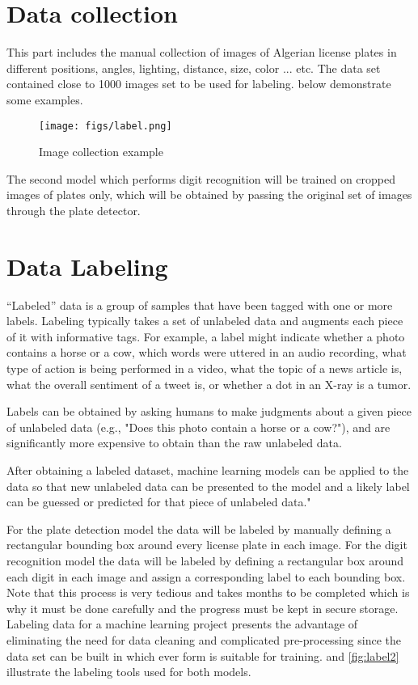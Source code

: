 \section{Data collection}
This part includes the manual collection of images of Algerian license plates in different positions, angles, lighting, distance, size, color ... etc. The data set contained close to 1000 images set to be used for labeling.  below demonstrate some examples.

\begin{figure}[H]
	\centering
	\texttt{[image: figs/label.png]}
	\caption{Image collection example}\label{fig:img1}
\end{figure}

The second model which performs digit recognition will be trained on cropped images of plates only, which will be obtained by passing the original set of images through the plate detector.

\section{Data Labeling}
``Labeled'' data is a group of samples that have been tagged with one or more labels. Labeling typically takes a set of unlabeled data and augments each piece of it with informative tags. For example, a label might indicate whether a photo contains a horse or a cow, which words were uttered in an audio recording, what type of action is being performed in a video, what the topic of a news article is, what the overall sentiment of a tweet is, or whether a dot in an X-ray is a tumor.

Labels can be obtained by asking humans to make judgments about a given piece of unlabeled data (e.g., "Does this photo contain a horse or a cow?"), and are significantly more expensive to obtain than the raw unlabeled data.

After obtaining a labeled dataset, machine learning models can be applied to the data so that new unlabeled data can be presented to the model and a likely label can be guessed or predicted for that piece of unlabeled data."

For the plate detection model the data will be labeled by manually defining a rectangular bounding box around every license plate in each image. For the digit recognition model the data will be labeled by defining a rectangular box around each digit in each image and assign a corresponding label to each bounding box. Note that this process is very tedious and takes months to be completed which is why it must be done carefully and the progress must be kept in secure storage. Labeling data for a machine learning project presents the advantage of eliminating the need for data cleaning and complicated pre-processing since the data set can be built in which ever form is suitable for training.  and \cref{fig:label2} illustrate the labeling tools used for both models.

